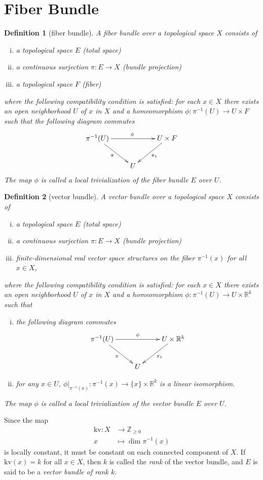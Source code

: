 \documentclass{report}
\newtheorem{definition}{Definition}[section]
\theoremstyle{nonumberplain}
\begin{document}
\section{Fiber Bundle}
\begin{definition}[fiber bundle]
	A \emph{fiber bundle} over a topological space $X$ consists of
	\begin{enumerate}[(i)]
		 \item a topological space $E$ (total space)
		 \item a continuous surjection $\pi:E\to X$ (bundle projection)
		 \item a topological space $F$ (fiber)
	\end{enumerate}
	where the following compatibility condition is satisfied: for each $x\in X$ there exists an open neighborhood $U$ of $x$ in $X$ and a homeomorphism $\phi:\pi^{-1}(U)\to U\times F$ such that
	the following diagram commutes
		\[\xymatrix{
			\pi^{-1}(U)\ar[rd]_{\pi}\ar[rr]^{\phi}  & &U\times F\ar[ld]^{\pi_1}\\
			&U&
			}\]
	The map $\phi$ is called a \emph{local trivialization} of the fiber bundle $E$ over $U$.
\end{definition}

\begin{definition}[vector bundle]
	A \emph{vector bundle} over a topological space $X$ consists of
	\begin{enumerate}[(i)]
		 \item a topological space $E$ (total space)
		 \item a continuous surjection $\pi:E\to X$ (bundle projection)
		 \item finite-dimensional real vector space structures on the fiber $\pi^{-1}(x)$ for all $x\in X$,
	\end{enumerate}
	where the following compatibility condition is satisfied: for each $x\in X$ there exists an open neighborhood $U$ of $x$ in $X$ and a homeomorphism $\phi:\pi^{-1}(U)\to U\times \mathbb{R}^k$ such that
	\begin{enumerate}[(i)]
		\item the following diagram commutes
		\[\xymatrix{
			\pi^{-1}(U)\ar[rd]_{\pi}\ar[rr]^{\phi}  & &U\times \mathbb{R}^k\ar[ld]^{\pi_1}\\
			&U&
			}\]
		\item for any $x\in U$, $\left.\phi\right|_{\pi^{-1}(x)}:\pi^{-1}(x)\to \{x\}\times \mathbb{R}^k$ is a linear isomorphism.
	\end{enumerate}
	The map $\phi$ is called a \emph{local trivialization} of the vector bundle $E$ over $U$.	
\end{definition}
Since the map 
\[
	\begin{aligned}
		\mathrm{kv}:X&\longrightarrow \mathbb{Z}_{\ge 0}\\
		x&\longmapsto \dim \pi^{-1}(x)
	\end{aligned}
\]
is locally constant, it must be constant on each connected component of $X$. If $\mathrm{kv}(x)=k$ for all $x\in X$, then $k$ is called the \emph{rank} of the vector bundle, and $E$ is said to be a \emph{vector bundle of rank $k$}.
\end{document}
